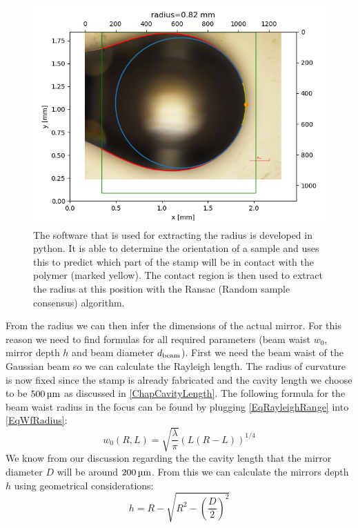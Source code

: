 \begin{figure}[H]
	\includegraphics[scale=0.6]{source/radius_analysis}
	\caption{The software that is used for extracting the radius is developed in python. It is able to determine the orientation of a sample and uses this to predict which part of the stamp will be in contact with the polymer (marked yellow). The contact region is then used to extract the radius at this position with the Ransac (Random sample consensus) algorithm.}
\end{figure}
From the radius we can then infer the dimensions of the actual mirror. For this reason we need to find formulas for all required parameters (beam waist $w_0$, mirror depth $h$ and beam diameter $\de{d}{beam}$). First we need the beam waist of the Gaussian beam so we can calculate the Rayleigh length. The radius of curvature is now fixed since the stamp is already fabricated and the cavity length we choose to be $500\um$ as discussed in \autoref{ChapCavityLength}. The following formula for the beam waist radius in the focus can be found by plugging \autoref{EqRayleighRange} into \autoref{EqWfRadius}:
\begin{equation}
	w_0(R, L)=\sqrt{\frac{\lambda}{\pi}}\left(L(R-L)\right)^{1/4}
\end{equation}
We know from our discussion regarding the the cavity length that the mirror diameter $D$ will be around $200\um$. From this we can calculate the mirrors depth $h$ using geometrical considerations:
\begin{equation}\label{EqH}
	h=R-\sqrt{R^2-\left(\frac{D}{2}\right)^2}
\end{equation}
